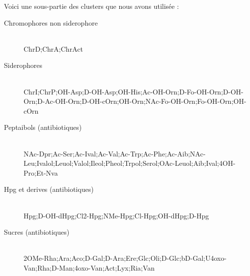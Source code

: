 \documentclass[a4paper,10pt]{report}
\begin{document}
	Voici une sous-partie des clusters que nous avons utilisée :
	
	\begin{description}
	 \item[Chromophores non siderophore] \hfill \\ChrD;ChrA;ChrAct
	 \item[Siderophores] \hfill \\ChrI;ChrP;OH-Asp;D-OH-Asp;OH-His;Ac-OH-Orn;D-Fo-OH-Orn;D-OH-Orn;D-Ac-OH-Orn;D-OH-cOrn;OH-Orn;NAc-Fo-OH-Orn;Fo-OH-Orn;OH-cOrn
	 \item[Peptaibols (antibiotiques)]\hfill \\ NAc-Dpr;Ac-Ser;Ac-Ival;Ac-Val;Ac-Trp;Ac-Phe;Ac-Aib;NAc-Leu;Ivalol;Leuol;Valol;Ileol;Pheol;Trpol;Serol;OAc-Leuol;Aib;Ival;4OH-Pro;Et-Nva
	 \item[Hpg et derives (antibiotiques)] \hfill \\Hpg;D-OH-dHpg;Cl2-Hpg;NMe-Hpg;Cl-Hpg;OH-dHpg;D-Hpg
	 \item[Sucres (antibiotiques)] \hfill \\2OMe-Rha;Ara;Aco;D-Gal;D-Ara;Ere;Glc;Oli;D-Glc;bD-Gal;U4oxo-Van;Rha;D-Man;4oxo-Van;Act;Lyx;Ria;Van
	\end{description}

	
	  
\end{document}
